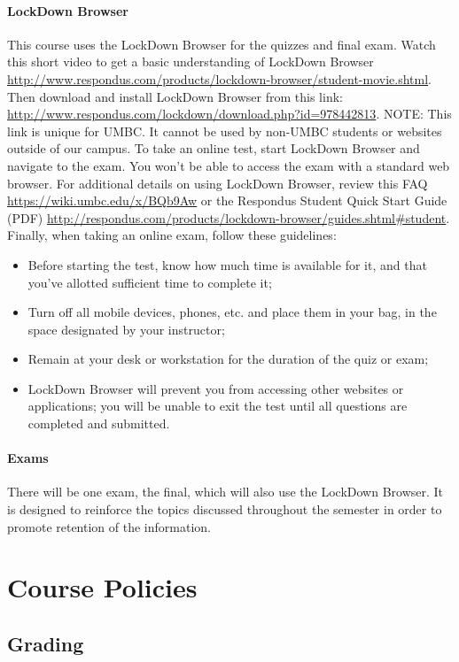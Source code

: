 \documentclass[letter,10pt]{article}
\begin{document}
\paragraph{LockDown Browser}This course uses the LockDown Browser for the quizzes and final exam. Watch this short video to get a basic understanding of LockDown Browser \url{http://www.respondus.com/products/lockdown-browser/student-movie.shtml}. Then download and install LockDown Browser from this link: \url{http://www.respondus.com/lockdown/download.php?id=978442813}. NOTE: This link is unique for UMBC. It cannot be used by non-UMBC students or websites outside of our campus. To take an online test, start LockDown Browser and navigate to the exam. You won't be able to access the exam with a standard web browser. For additional details on using LockDown Browser, review this FAQ \url{https://wiki.umbc.edu/x/BQb9Aw} or the Respondus Student Quick Start Guide (PDF) \url{http://respondus.com/products/lockdown-browser/guides.shtml#student}. Finally, when taking an online exam, follow these guidelines:
\begin{itemize}
\item Before starting the test, know how much time is available for it, and that you've allotted sufficient time to complete it;
\item Turn off all mobile devices, phones, etc. and place them in your bag, in the space designated by your instructor;
\item Remain at your desk or workstation for the duration of the quiz or exam;
\item LockDown Browser will prevent you from accessing other websites or applications; you will be unable to exit the test until all questions are completed and submitted.
\end{itemize}

\paragraph{Exams}There will be one exam, the final, which will also use the LockDown Browser. It is designed to reinforce the topics discussed throughout the semester in order to promote retention of the information.

\section*{Course Policies}
\subsection*{Grading}
\end{document}
